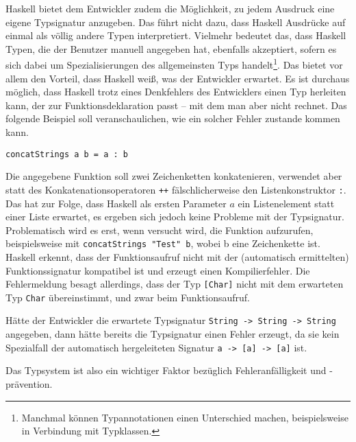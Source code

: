 Haskell bietet dem Entwickler zudem die Möglichkeit, zu jedem Ausdruck eine eigene Typsignatur anzugeben. Das führt nicht dazu,
dass Haskell Ausdrücke auf einmal als völlig andere Typen interpretiert. Vielmehr bedeutet das, dass Haskell Typen, die der
Benutzer manuell angegeben hat, ebenfalls akzeptiert, sofern es sich dabei um Spezialisierungen des allgemeinsten Typs handelt\footnote{Manchmal können Typannotationen einen Unterschied machen, beispielsweise in Verbindung mit Typklassen.}.
Das bietet vor allem den Vorteil, dass Haskell weiß, was der Entwickler erwartet. Es ist durchaus möglich, dass Haskell trotz eines
Denkfehlers des Entwicklers einen Typ herleiten kann, der zur Funk\-tions\-de\-kla\-rati\-on passt -- mit dem man aber nicht rechnet.
Das folgende Beispiel soll veranschaulichen, wie ein solcher Fehler zustande kommen kann.

\begin{verbatim}
concatStrings a b = a : b
\end{verbatim}


Die angegebene Funktion soll zwei Zeichenketten konkatenieren, verwendet aber statt des Konkatenationsoperatoren \texttt{++} fälschlicherweise den
Listenkonstruktor \texttt{:}. Das hat zur Folge, dass Haskell als ersten Parameter $a$ ein Listenelement statt einer Liste erwartet,
es ergeben sich jedoch keine Probleme mit der Typsignatur. Problematisch wird es erst, wenn versucht wird, die Funktion
aufzurufen, beispielsweise mit \texttt{concatStrings "Test" b}, wobei b eine Zeichenkette ist. Haskell erkennt, dass der
Funktionsaufruf nicht mit der (automatisch ermittelten) Funktionssignatur kompatibel ist und erzeugt einen Kompilierfehler. Die
Fehlermeldung besagt allerdings, dass der Typ \texttt{[Char]} nicht mit dem erwarteten Typ \texttt{Char} übereinstimmt,
und zwar beim Funktionsaufruf.

Hätte der Entwickler die erwartete Typsignatur \texttt{String -> String -> String} angegeben, dann hätte bereits die Typsignatur
einen Fehler erzeugt, da sie kein Spezialfall der automatisch hergeleiteten Signatur \texttt{a -> [a] -> [a]} ist.

 Das Typsystem ist also ein wichtiger Faktor bezüglich Fehleranfälligkeit und -prävention.

